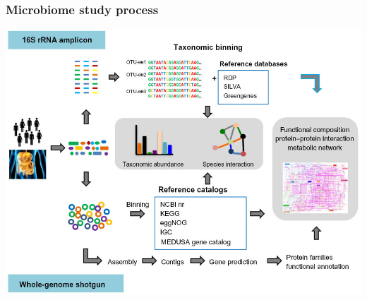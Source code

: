 \documentclass[10pt]{beamer}
\begin{document}


\begin{frame}
  \frametitle{Microbiome study process}
  \centering
  \includegraphics[width=\linewidth]{microbiome-study2.png}
\end{frame}
\end{document}
